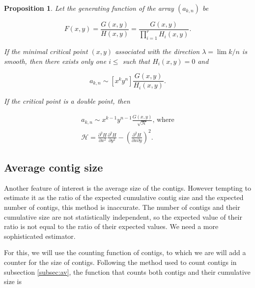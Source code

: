 \documentclass{article}
\newtheorem{proposition}{Proposition}
\begin{document}
\begin{proposition}
Let the generating function of the array $(a_{k,n})$ be

\begin{equation*}
F(x,y) = \frac{G(x,y)}{H(x,y)} =
\frac{G(x,y)}{\prod_{i=1}^rH_i(x,y)}.
\end{equation*}

If the minimal critical point $(x,y)$ associated with the direction
$\lambda = \lim k/n$ is smooth, then there exists only one $i \leq $ such
that $H_i(x,y) = 0$ and

\begin{equation*}
a_{k,n} \sim [x^ky^n] \frac{G(x,y)}{H_i(x,y)}.
\end{equation*}


If the critical point is a double point, then

\begin{equation*}
\begin{split}
a_{k,n} \sim x^{k-1}y^{n-1} \frac{G(x,y)}{\sqrt{\mathcal{H}}}
\text{, where} \\
\mathcal{H} = \frac{\partial^2H}{\partial x^2}
  \frac{\partial^2H}{\partial y^2} -
\left( \frac{\partial^2H}{\partial x\partial y} \right)^2.
\end{split}
\end{equation*}


\end{proposition}







\subsection{Average contig size}
\label{subsec:avctsz}

Another feature of interest is the average size of the contigs. However
tempting to estimate it as the ratio of the expected cumulative contig
size and the expected number of contigs, this method is inaccurate. The
number of contigs and their cumulative size are not statistically
independent, so the expected value of their ratio is not equal to the
ratio of their expected values. We need a more sophisticated estimator.

For this, we will use the counting function of contigs, to which we are
will add a counter for the size of contigs. Following the method used to
count contigs in subsection \ref{subsec:av}, the function that counts
both contigs and their cumulative size is
\end{document}

